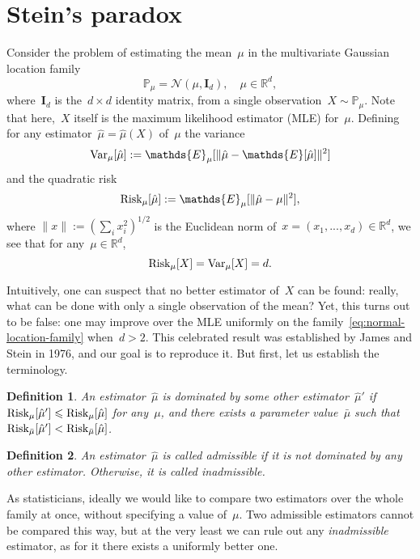 \documentclass[11pt]{article}
\newtheorem{definition}{Definition}%
\newcommand{\R}{\mathds{R}}
\newcommand{\E}{\mathds{E}}
\newcommand{\cN}{\mathcal{N}}
\newcommand{\Prob}{\mathds{P}}
\newcommand{\Var}{\textup{Var}}
\newcommand{\Risk}{\textup{Risk}}
\newcommand{\bId}{\boldsymbol{I}}
\newcommand{\leqs}{\leqslant}
\renewcommand{\le}{\leqs}
\begin{document}
\newpage
\noindent
\section{Stein's paradox}

Consider the problem of estimating the mean~$\mu$ in the multivariate Gaussian location family
\begin{equation}
\label{eq:normal-location-family}
\Prob_\mu = \cN(\mu, \bId_d), \quad \mu \in \R^d,
\end{equation}
where~$\bId_d$ is the~$d \times d$ identity matrix, from a single observation~$X \sim \Prob_\mu$.
Note that here,~$X$ itself is the maximum likelihood estimator (MLE) for~$\mu$. Defining for any estimator~$\hat\mu = \hat \mu(X)$ of~$\mu$ the variance
\[
\Var_{\mu}[\hat\mu] := \E_{\mu}[\|\hat \mu - \E[\hat\mu]\|^2]
\] 
and the quadratic risk
\[
\Risk_{\mu}[\hat\mu] := \E_{\mu}[\|\hat \mu - \mu\|^2],
\] 
where $\|x\| := (\sum_{i} x_i^2)^{1/2}$ is the Euclidean norm of~$x = (x_1,...,x_d) \in \R^d$, we see that for any~$\mu \in \R^d$,
\[
\Risk_{\mu}[X] = \Var_{\mu}[X] = d.
\]

Intuitively, one can suspect that no better estimator of~$X$ can be found: really, what can be done with only a single observation of the mean?
Yet, this turns out to be false: one may improve over the MLE uniformly on the family~\eqref{eq:normal-location-family} when~$d > 2$.
This celebrated result was established by James and Stein in 1976, and our goal is to reproduce it.
But first, let us establish the terminology.

\begin{definition}
{\em 
An estimator~$\hat\mu$ is {\em dominated} by some other estimator~$\hat \mu'$ if~$\Risk_{\mu}[\hat\mu'] \le \Risk_{\mu}[\hat\mu]$ for any~$\mu$, and there exists a parameter value~$\bar\mu$ such that~$\Risk_{\bar\mu}[\hat\mu'] < \Risk_{\bar\mu}[\hat\mu]$.
}
\end{definition}

\begin{definition}
{\em 
An estimator~$\hat\mu$ is called {\em admissible} if it is not dominated by any other estimator. Otherwise, it is called {\em inadmissible}.
}
\end{definition}

As statisticians, ideally we would like to compare two estimators over the whole family at once, without specifying a value of~$\mu$. %
Two admissible estimators cannot be compared this way, but at the very least we can rule out any {\em inadmissible} estimator, as for it there exists a uniformly better one.\\
\end{document}
